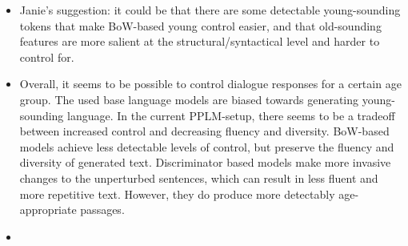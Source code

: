 \begin{itemize}
    \item Janie's suggestion: it could be that there are some detectable young-sounding tokens that make BoW-based young control easier, and that old-sounding features are more salient at the structural/syntactical level and harder to control for.
    \item Overall, it seems to be possible to control dialogue responses for a certain age group. The used base language models are biased towards generating young-sounding language. In the current PPLM-setup, there seems to be a tradeoff between increased control and decreasing fluency and diversity. BoW-based models achieve less detectable levels of control, but preserve the fluency and diversity of generated text. Discriminator based models make more invasive changes to the unperturbed sentences, which can result in less fluent and more repetitive text. However, they do produce more detectably age-appropriate passages.
    \item {}
\end{itemize}

